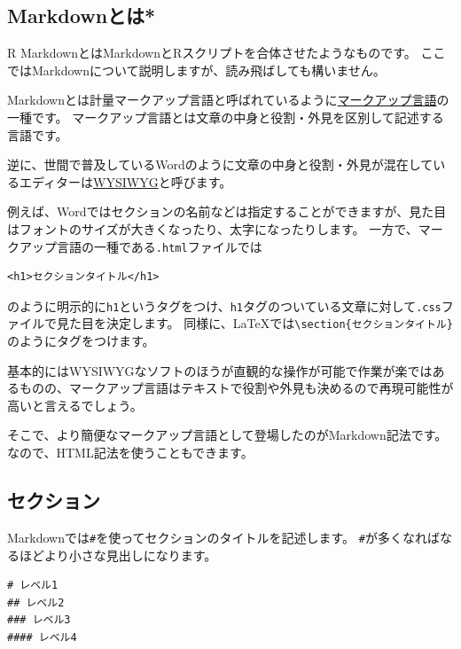 \documentclass[]{bxjsreport}
\let\asdf\section
\renewcommand{\section}{\chapter}
\let\asdff\subsection
\renewcommand{\subsection}{\asdf}
\renewcommand{\subsubsection}{\asdff}
\begin{document}
\hypertarget{markdownux3068ux306f}{%
\subsubsection{Markdownとは*}\label{markdownux3068ux306f}}

R MarkdownとはMarkdownとRスクリプトを合体させたようなものです。
ここではMarkdownについて説明しますが、読み飛ばしても構いません。

Markdownとは計量マークアップ言語と呼ばれているように\href{https://ja.wikipedia.org/wiki/\%E3\%83\%9E\%E3\%83\%BC\%E3\%82\%AF\%E3\%82\%A2\%E3\%83\%83\%E3\%83\%97\%E8\%A8\%80\%E8\%AA\%9E}{マークアップ言語}の一種です。
マークアップ言語とは文章の中身と役割・外見を区別して記述する言語です。

逆に、世間で普及しているWordのように文章の中身と役割・外見が混在しているエディターは\href{https://ja.wikipedia.org/wiki/WYSIWYG}{WYSIWYG}と呼びます。

例えば、Wordではセクションの名前などは指定することができますが、見た目はフォントのサイズが大きくなったり、太字になったりします。
一方で、マークアップ言語の一種である\texttt{.html}ファイルでは

\begin{verbatim}
<h1>セクションタイトル</h1>
\end{verbatim}

のように明示的に\texttt{h1}というタグをつけ、\texttt{h1}タグのついている文章に対して\texttt{.css}ファイルで見た目を決定します。
同様に、LaTeXでは\texttt{\textbackslash{}section\{セクションタイトル\}}のようにタグをつけます。

基本的にはWYSIWYGなソフトのほうが直観的な操作が可能で作業が楽ではあるものの、マークアップ言語はテキストで役割や外見も決めるので再現可能性が高いと言えるでしょう。

そこで、より簡便なマークアップ言語として登場したのがMarkdown記法です。
なので、HTML記法を使うこともできます。

\hypertarget{ux30bbux30afux30b7ux30e7ux30f3}{%
\subsubsection{セクション}\label{ux30bbux30afux30b7ux30e7ux30f3}}

Markdownでは\texttt{\#}を使ってセクションのタイトルを記述します。
\texttt{\#}が多くなればなるほどより小さな見出しになります。

\begin{verbatim}
# レベル1
## レベル2
### レベル3
#### レベル4
\end{verbatim}
\end{document}
